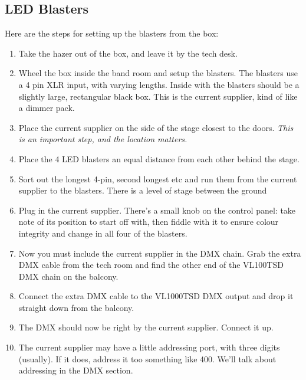 \documentclass[letterpaper,10pt,oneside,headsepline]{scrreprt}
\begin{document}
\subsection{LED Blasters}
Here are the steps for setting up the blasters from the box:
\begin{enumerate}
\item Take the hazer out of the box, and leave it by the tech desk.
\item Wheel the box inside the band room and setup the blasters. The blasters use a 4 pin XLR input, with varying lengths. Inside with the blasters should be a slightly large, rectangular black box. This is the current supplier, kind of like a dimmer pack.
\item Place the current supplier on the side of the stage closest to the doors. \textit{This is an important step, and the location matters.}
\item Place the 4 LED blasters an equal distance from each other behind the stage. 
\item Sort out the longest 4-pin, second longest etc and run them from the current supplier to the blasters. There is a level of stage between the ground

\item Plug in the current supplier. There's a small knob on the control panel: take note of its position to start off with, then fiddle with it to ensure colour integrity and change in all four of the blasters. 
\item Now you must include the current supplier in the DMX chain. Grab the extra DMX cable from the tech room and find the other end of the VL100TSD DMX chain on the balcony.
\item Connect the extra DMX cable to the VL1000TSD DMX output and drop it straight down from the balcony.
\item The DMX should now be right by the current supplier. Connect it up.
\item The current supplier may have a little addressing port, with three digits (usually). If it does, address it too something like 400. We'll talk about addressing in the DMX section.
\end{enumerate}
\end{document}
